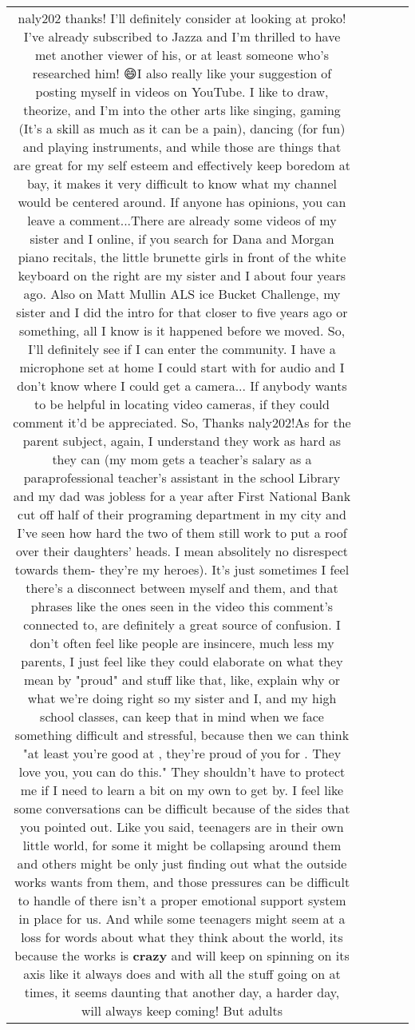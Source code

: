 \documentclass[11pt]{article}
\newlength\mylength
\begin{document}
\begin{center}
\begin{longtable}{|C{.65\mylength}|C{.30\mylength}|C{.12\mylength}|C{.12\mylength}|C{.12\mylength}|}
  \small naly202 thanks! I'll definitely consider at looking at proko! I've already subscribed to Jazza and I'm thrilled to have met another viewer of his, or at least someone who's researched him! 😄I also really like your suggestion of posting myself in videos on YouTube. I like to draw, theorize, and I'm into the other arts like singing, gaming (It's a skill as much as it can be a pain), dancing (for fun) and playing instruments, and while those are things that are great for my self esteem and effectively keep boredom at bay, it makes it very difficult to know what my channel would be centered around. If anyone has opinions, you can leave a comment...There are already some videos of my sister and I online, if you search for Dana and Morgan piano recitals, the little brunette girls in front of the white keyboard on the right are my sister and I about four years ago. Also on Matt Mullin ALS ice Bucket Challenge, my sister and I did the intro for that closer to five years ago or something, all I know is it happened before we moved. So, I'll definitely see if I can enter the community. I have a microphone set at home I could start with for audio and I don't know where I could get a camera... If anybody wants to be helpful in locating video cameras, if they could comment it'd be appreciated. So, Thanks naly202!As for the parent subject, again, I understand they work as hard as they can (my mom gets a teacher's salary as a paraprofessional teacher's assistant in the school Library and my dad was jobless for a year after First National Bank cut off half of their programing department in my city and I've seen how hard the two of them still work to put a roof over their daughters' heads. I mean absolitely no disrespect towards them- they're my heroes). It's just sometimes I feel there's a disconnect between myself and them,  and that phrases like the ones seen in the video this comment's connected to, are definitely a great source of confusion. I don't often feel like people are insincere, much less my parents, I just feel like they could elaborate on what they mean by "proud" and stuff like that, like, explain why or what we're doing right so my sister and I, and my high school classes, can keep that in mind when we face something difficult and stressful, because then we can think "at least you're good at     , they're proud of you for   . They love you, you can do this." They shouldn't have to protect me if I need to learn a bit on my own to get by. I feel like some conversations can be difficult because of the sides that you pointed out. Like you said, teenagers are in their own little world, for some it might be collapsing around them and others might be only just finding out what the outside works wants from them, and those pressures can be difficult to handle of there isn't a proper emotional support system in place for us. And while some teenagers might seem at a loss for words about what they think about the world,  its because the works is \textbf{crazy} and will keep on spinning on its axis like it always does and with all the stuff going on at times, it seems daunting that another day, a harder day, will always keep coming! But adults 
\end{longtable}
\end{center}
\end{document}
